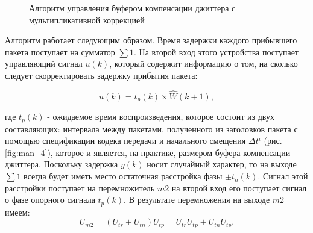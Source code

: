 \begin{figure}[!h]
\caption{Алгоритм управления буфером компенсации джиттера с мультипликативной коррекцией}
\label{fig:man_3}
\end{figure}

Алгоритм работает следующим образом. 
Время задержки каждого прибывшего пакета поступает на сумматор $\sum 1$. 
На второй вход этого устройства поступает управляющий сигнал $u(k)$, который содержит информацию о том, на сколько следует скорректировать задержку прибытия пакета:

\begin{equation}\label{eq41:man13}
u(k)=t_p(k)\times \hat W(k+1),
\end{equation}

\noindent где $t_p(k)$ - ожидаемое время воспроизведения, которое состоит из двух составляющих: интервала между пакетами, полученного из заголовков пакета с помощью спецификации кодека передачи и начального смещения $\Delta t^i$ (рис. \ref{fig:man_4}), которое и является, на практике, размером буфера компенсации джиттера.
Поскольку задержка $y(k)$ носит случайный характер, то на выходе $\sum 1$ всегда будет иметь место остаточная расстройка фазы $\pm t_n(k)$.
Сигнал этой расстройки поступает на перемножитель $m2$ на второй вход его поступает сигнал о фазе опорного сигнала $t_p(k)$. 
В результате перемножения на выходе $m2$ имеем:
\begin{equation}\label{eq41:man14}
U_{m2}=(U_{tr}+U_{tn})U_{tp}=U_{tr}U_{tp}+U_{tn}U_{tp}.
\end{equation}

